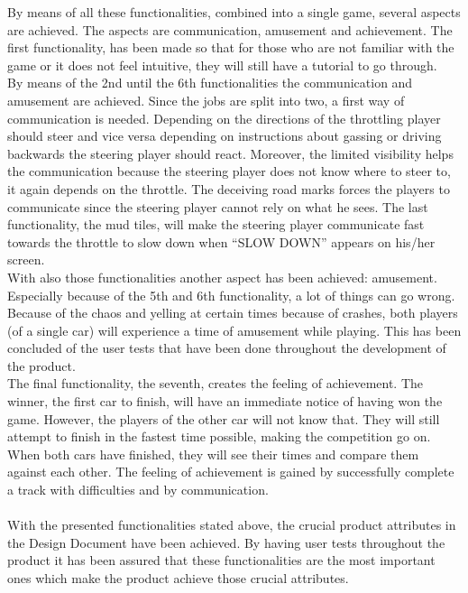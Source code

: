 \documentclass[11pt,twoside,a4paper]{article}
\begin{document}
\newpage

By means of all these functionalities, combined into a single game, several aspects are achieved. The aspects are communication, amusement and achievement.  
The first functionality, has been made so that for those who are not familiar with the game or it does not feel intuitive, they will still have a tutorial to go through. \\

By means of the 2nd until the 6th functionalities the communication and amusement are achieved. Since the jobs are split into two, a first way of communication is needed. Depending on the directions of the throttling player should steer and vice versa depending on instructions about gassing or driving backwards the steering player should react. Moreover, the limited visibility helps the communication because the steering player does not know where to steer to, it again depends on the throttle. The deceiving road marks forces the players to communicate since the steering player cannot rely on what he sees. The last functionality, the mud tiles, will make the steering player communicate fast towards the throttle to slow down when “SLOW DOWN” appears on his/her screen. \\

With also those functionalities another aspect has been achieved: amusement. Especially because of the 5th and 6th functionality, a lot of things can go wrong. Because of the chaos and yelling at certain times because of crashes, both players (of a single car) will experience a time of amusement while playing. This has been concluded of the user tests that have been done throughout the development of the product. \\

The final functionality, the seventh, creates the feeling of achievement. The winner, the first car to finish, will have an immediate notice of having won the game. However, the players of the other car will not know that. They will still attempt to finish in the fastest time possible, making the competition go on. When both cars have finished, they will see their times and compare them against each other. The feeling of achievement is gained by successfully complete a track with difficulties and by communication. \\ \\

With the presented functionalities stated above, the crucial product attributes in the Design Document have been achieved. By having user tests throughout the product it has been assured that these functionalities are the most important ones which make the product achieve those crucial attributes.
\end{document}
